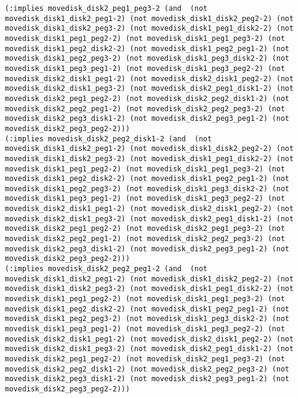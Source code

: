 \documentclass[12pt,letterpaper]{ntdhw}
\begin{document}
\begin{enumerate}
\begin{enumerate}
\begin{lstlisting}[language=pddl, style=pddlstyle,
  basicstyle=\scriptsize]
(:implies movedisk_disk2_peg1_peg3-2 (and  (not movedisk_disk1_disk2_peg1-2) (not movedisk_disk1_disk2_peg2-2) (not movedisk_disk1_disk2_peg3-2) (not movedisk_disk1_peg1_disk2-2) (not movedisk_disk1_peg1_peg2-2) (not movedisk_disk1_peg1_peg3-2) (not movedisk_disk1_peg2_disk2-2) (not movedisk_disk1_peg2_peg1-2) (not movedisk_disk1_peg2_peg3-2) (not movedisk_disk1_peg3_disk2-2) (not movedisk_disk1_peg3_peg1-2) (not movedisk_disk1_peg3_peg2-2) (not movedisk_disk2_disk1_peg1-2) (not movedisk_disk2_disk1_peg2-2) (not movedisk_disk2_disk1_peg3-2) (not movedisk_disk2_peg1_disk1-2) (not movedisk_disk2_peg1_peg2-2) (not movedisk_disk2_peg2_disk1-2) (not movedisk_disk2_peg2_peg1-2) (not movedisk_disk2_peg2_peg3-2) (not movedisk_disk2_peg3_disk1-2) (not movedisk_disk2_peg3_peg1-2) (not movedisk_disk2_peg3_peg2-2)))
(:implies movedisk_disk2_peg2_disk1-2 (and  (not movedisk_disk1_disk2_peg1-2) (not movedisk_disk1_disk2_peg2-2) (not movedisk_disk1_disk2_peg3-2) (not movedisk_disk1_peg1_disk2-2) (not movedisk_disk1_peg1_peg2-2) (not movedisk_disk1_peg1_peg3-2) (not movedisk_disk1_peg2_disk2-2) (not movedisk_disk1_peg2_peg1-2) (not movedisk_disk1_peg2_peg3-2) (not movedisk_disk1_peg3_disk2-2) (not movedisk_disk1_peg3_peg1-2) (not movedisk_disk1_peg3_peg2-2) (not movedisk_disk2_disk1_peg1-2) (not movedisk_disk2_disk1_peg2-2) (not movedisk_disk2_disk1_peg3-2) (not movedisk_disk2_peg1_disk1-2) (not movedisk_disk2_peg1_peg2-2) (not movedisk_disk2_peg1_peg3-2) (not movedisk_disk2_peg2_peg1-2) (not movedisk_disk2_peg2_peg3-2) (not movedisk_disk2_peg3_disk1-2) (not movedisk_disk2_peg3_peg1-2) (not movedisk_disk2_peg3_peg2-2)))
(:implies movedisk_disk2_peg2_peg1-2 (and  (not movedisk_disk1_disk2_peg1-2) (not movedisk_disk1_disk2_peg2-2) (not movedisk_disk1_disk2_peg3-2) (not movedisk_disk1_peg1_disk2-2) (not movedisk_disk1_peg1_peg2-2) (not movedisk_disk1_peg1_peg3-2) (not movedisk_disk1_peg2_disk2-2) (not movedisk_disk1_peg2_peg1-2) (not movedisk_disk1_peg2_peg3-2) (not movedisk_disk1_peg3_disk2-2) (not movedisk_disk1_peg3_peg1-2) (not movedisk_disk1_peg3_peg2-2) (not movedisk_disk2_disk1_peg1-2) (not movedisk_disk2_disk1_peg2-2) (not movedisk_disk2_disk1_peg3-2) (not movedisk_disk2_peg1_disk1-2) (not movedisk_disk2_peg1_peg2-2) (not movedisk_disk2_peg1_peg3-2) (not movedisk_disk2_peg2_disk1-2) (not movedisk_disk2_peg2_peg3-2) (not movedisk_disk2_peg3_disk1-2) (not movedisk_disk2_peg3_peg1-2) (not movedisk_disk2_peg3_peg2-2)))

\end{lstlisting}
\end{enumerate}
\end{enumerate}
\end{document}
